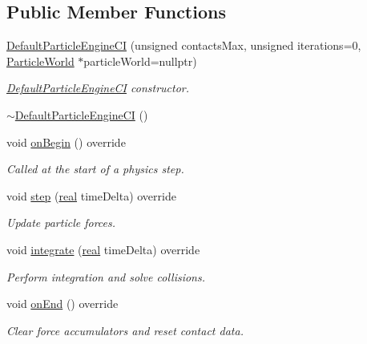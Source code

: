 \subsection*{Public Member Functions}
\begin{DoxyCompactItemize}
\item 
\mbox{\hyperlink{classr3_1_1_default_particle_engine_c_i_a5f7619a5dd227d681d5dcbde6e8368eb}{Default\+Particle\+Engine\+CI}} (unsigned contacts\+Max, unsigned iterations=0, \mbox{\hyperlink{classr3_1_1_particle_world}{Particle\+World}} $\ast$particle\+World=nullptr)
\begin{DoxyCompactList}\small\item\em \mbox{\hyperlink{classr3_1_1_default_particle_engine_c_i}{Default\+Particle\+Engine\+CI}} constructor. \end{DoxyCompactList}\item 
\mbox{\hyperlink{classr3_1_1_default_particle_engine_c_i_afb7df43eb7fe45d6bcb15c39e3c30849}{$\sim$\+Default\+Particle\+Engine\+CI}} ()
\item 
void \mbox{\hyperlink{classr3_1_1_default_particle_engine_c_i_aaf2e9ca87bff5e48c8eb59384e9cf180}{on\+Begin}} () override
\begin{DoxyCompactList}\small\item\em Called at the start of a physics step. \end{DoxyCompactList}\item 
void \mbox{\hyperlink{classr3_1_1_default_particle_engine_c_i_a7c58fd00ec521410e1b412e9885ee0d2}{step}} (\mbox{\hyperlink{namespacer3_ab2016b3e3f743fb735afce242f0dc1eb}{real}} time\+Delta) override
\begin{DoxyCompactList}\small\item\em Update particle forces. \end{DoxyCompactList}\item 
void \mbox{\hyperlink{classr3_1_1_default_particle_engine_c_i_a4603707afe6c841a83294a46ea4a1c62}{integrate}} (\mbox{\hyperlink{namespacer3_ab2016b3e3f743fb735afce242f0dc1eb}{real}} time\+Delta) override
\begin{DoxyCompactList}\small\item\em Perform integration and solve collisions. \end{DoxyCompactList}\item 
void \mbox{\hyperlink{classr3_1_1_default_particle_engine_c_i_a6a34c77436d8133560eaa7366c740119}{on\+End}} () override
\begin{DoxyCompactList}\small\item\em Clear force accumulators and reset contact data. \end{DoxyCompactList}\item 

\end{DoxyCompactItemize}
